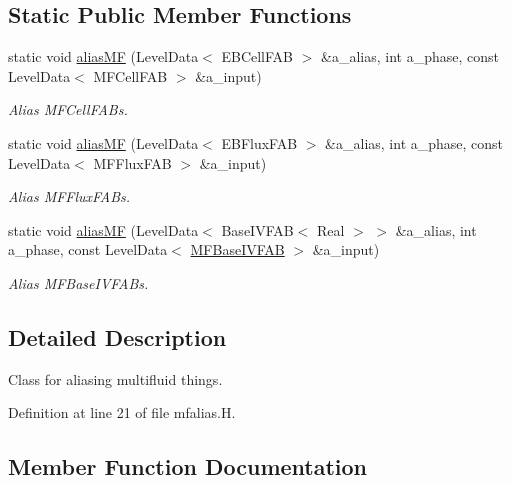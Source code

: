 \subsection*{Static Public Member Functions}
\begin{DoxyCompactItemize}
\item 
static void \hyperlink{classmfalias_a358d3fcab293f718e725ef48ee69f4d4}{alias\+MF} (Level\+Data$<$ E\+B\+Cell\+F\+AB $>$ \&a\+\_\+alias, int a\+\_\+phase, const Level\+Data$<$ M\+F\+Cell\+F\+AB $>$ \&a\+\_\+input)
\begin{DoxyCompactList}\small\item\em Alias M\+F\+Cell\+F\+A\+Bs. \end{DoxyCompactList}\item 
static void \hyperlink{classmfalias_a17f16f1a586891c721d3203f4a19191d}{alias\+MF} (Level\+Data$<$ E\+B\+Flux\+F\+AB $>$ \&a\+\_\+alias, int a\+\_\+phase, const Level\+Data$<$ M\+F\+Flux\+F\+AB $>$ \&a\+\_\+input)
\begin{DoxyCompactList}\small\item\em Alias M\+F\+Flux\+F\+A\+Bs. \end{DoxyCompactList}\item 
static void \hyperlink{classmfalias_a4e17109defb77da2bd04127541a6d890}{alias\+MF} (Level\+Data$<$ Base\+I\+V\+F\+AB$<$ Real $>$ $>$ \&a\+\_\+alias, int a\+\_\+phase, const Level\+Data$<$ \hyperlink{classMFBaseIVFAB}{M\+F\+Base\+I\+V\+F\+AB} $>$ \&a\+\_\+input)
\begin{DoxyCompactList}\small\item\em Alias M\+F\+Base\+I\+V\+F\+A\+Bs. \end{DoxyCompactList}\end{DoxyCompactItemize}


\subsection{Detailed Description}
Class for aliasing multifluid things. 

Definition at line 21 of file mfalias.\+H.



\subsection{Member Function Documentation}
